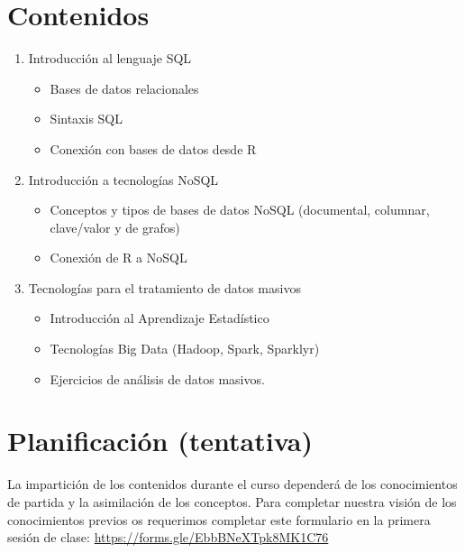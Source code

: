 \documentclass[
]{book}
\providecommand{\tightlist}{%
  \setlength{\itemsep}{0pt}\setlength{\parskip}{0pt}}
\begin{document}
\hypertarget{contenidos}{%
\section{Contenidos}\label{contenidos}}

\begin{enumerate}
\def\labelenumi{\arabic{enumi}.}
\tightlist
\item
  Introducción al lenguaje SQL

  \begin{itemize}
  \tightlist
  \item
    Bases de datos relacionales
  \item
    Sintaxis SQL
  \item
    Conexión con bases de datos desde R
  \end{itemize}
\item
  Introducción a tecnologías NoSQL

  \begin{itemize}
  \tightlist
  \item
    Conceptos y tipos de bases de datos NoSQL (documental, columnar, clave/valor y de grafos)
  \item
    Conexión de R a NoSQL
  \end{itemize}
\item
  Tecnologías para el tratamiento de datos masivos

  \begin{itemize}
  \tightlist
  \item
    Introducción al Aprendizaje Estadístico
  \item
    Tecnologías Big Data (Hadoop, Spark, Sparklyr)
  \item
    Ejercicios de análisis de datos masivos.
  \end{itemize}
\end{enumerate}

\hypertarget{planificaciuxf3n-tentativa}{%
\section{Planificación (tentativa)}\label{planificaciuxf3n-tentativa}}

La impartición de los contenidos durante el curso dependerá de los conocimientos de partida y la asimilación de los
conceptos. Para completar nuestra visión de los conocimientos previos os requerimos completar este formulario en la primera sesión de clase: \url{https://forms.gle/EbbBNeXTpk8MK1C76}
\end{document}

